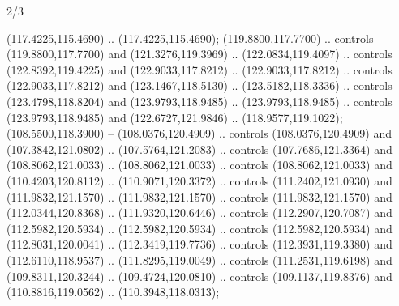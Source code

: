 \begin{flagdescription}{2/3}
\begin{scope}[scale=0.00214\flagwidth,yshift=164.5mm]
\begin{scope}[y=-0.8pt, x=0.8pt, inner sep=0pt, outer sep=0pt]
\begin{scope}[draw=black,fill=dark,line width=0.162pt]
  (117.4225,115.4690) .. (117.4225,115.4690);
 (119.8800,117.7700) .. controls (119.8800,117.7700) and
  (121.3276,119.3969) .. (122.0834,119.4097) .. controls (122.8392,119.4225) and
  (122.9033,117.8212) .. (122.9033,117.8212) .. controls (122.9033,117.8212) and
  (123.1467,118.5130) .. (123.5182,118.3336) .. controls (123.4798,118.8204) and
  (123.9793,118.9485) .. (123.9793,118.9485) .. controls (123.9793,118.9485) and
  (122.6727,121.9846) .. (118.9577,119.1022);
 (108.5500,118.3900) -- (108.0376,120.4909) .. controls
  (108.0376,120.4909) and (107.3842,121.0802) .. (107.5764,121.2083) .. controls
  (107.7686,121.3364) and (108.8062,121.0033) .. (108.8062,121.0033) .. controls
  (108.8062,121.0033) and (110.4203,120.8112) .. (110.9071,120.3372) .. controls
  (111.2402,121.0930) and (111.9832,121.1570) .. (111.9832,121.1570) .. controls
  (111.9832,121.1570) and (112.0344,120.8368) .. (111.9320,120.6446) .. controls
  (112.2907,120.7087) and (112.5982,120.5934) .. (112.5982,120.5934) .. controls
  (112.5982,120.5934) and (112.8031,120.0041) .. (112.3419,119.7736) .. controls
  (112.3931,119.3380) and (112.6110,118.9537) .. (111.8295,119.0049) .. controls
  (111.2531,119.6198) and (109.8311,120.3244) .. (109.4724,120.0810) .. controls
  (109.1137,119.8376) and (110.8816,119.0562) .. (110.3948,118.0313);
\end{scope}
\end{scope}
\end{scope}
\fi
\framecode{}
\end{flagdescription}
